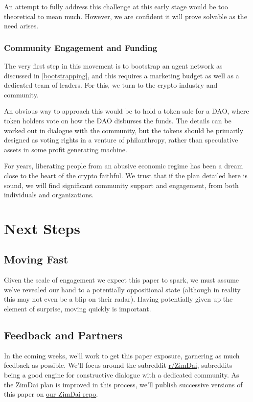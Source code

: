 \documentclass{article}
\begin{document}
An attempt to fully address this challenge at this early stage would be too theoretical to mean much. However, we are confident it will prove solvable as the need arises.

\subsubsection{Community Engagement and Funding} \label{community funding}

The very first step in this movement is to bootstrap an agent network as discussed in \ref{bootstrapping}, and this requires a marketing budget as well as a dedicated team of leaders. For this, we turn to the crypto industry and community.

An obvious way to approach this would be to hold a token sale for a DAO, where token holders vote on how the DAO disburses the funds. The details can be worked out in dialogue with the community, but the tokens should be primarily designed as voting rights in a venture of philanthropy, rather than speculative assets in some profit generating machine.

For years, liberating people from an abusive economic regime has been a dream close to the heart of the crypto faithful. We trust that if the plan detailed here is sound, we will find significant community support and engagement, from both individuals and organizations.

\section{Next Steps} \label{next steps}

\subsection{Moving Fast} \label{moving fast}

Given the scale of engagement we expect this paper to spark, we must assume we've revealed our hand to a potentially oppositional state (although in reality this may not even be a blip on their radar). Having potentially given up the element of surprise, moving quickly is important.

\subsection{Feedback and Partners} \label{feedback and partners}

In the coming weeks, we'll work to get this paper exposure, garnering as much feedback as possible. We'll focus around the subreddit \href{https://www.reddit.com/r/ZimDai}{r/ZimDai}, subreddits being a good engine for constructive dialogue with a dedicated community. As the ZimDai plan is improved in this process, we'll publish successive versions of this paper on \href{https://github.com/coinop-logan/ZimDai/blob/master/whitepaper.pdf}{our ZimDai repo}.
\end{document}
